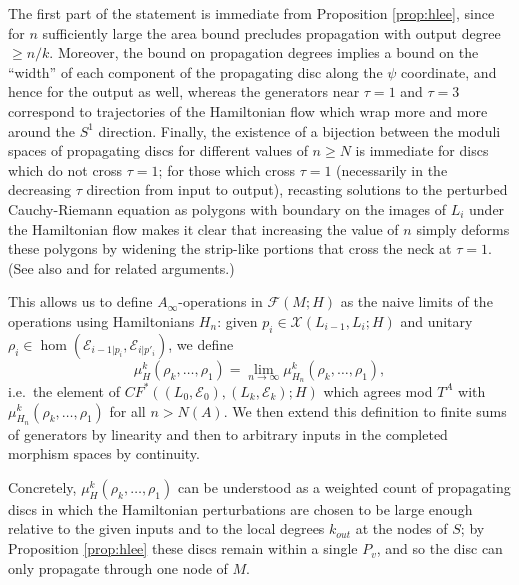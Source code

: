 \documentclass[11pt,leqno]{amsart}
\numberwithin{equation}{section}
\def\F{{\mathcal F}}
\newcommand{\cE}{{\mathcal E}}
\newcommand{\cX}{{\mathcal X}}
\begin{document}
\proof The first part of the statement is immediate from Proposition \ref{prop:hlee}, 
since for $n$ sufficiently large the area bound precludes propagation with output degree $\geq n/k$.
Moreover, the bound on propagation degrees implies a bound on the ``width'' of
each component of the propagating disc along the $\psi$ coordinate, and
hence for the output as well, whereas 
the generators near $\tau=1$ and $\tau=3$ correspond to trajectories of the
Hamiltonian flow which wrap more and more around the $S^1$ direction.
Finally, the existence of a bijection between the moduli spaces
of propagating discs for different values of $n\geq N$ is immediate for
discs which do not cross $\tau=1$; for those which cross $\tau=1$ (necessarily in the decreasing
$\tau$ direction from input to output), recasting
solutions to the perturbed Cauchy-Riemann equation as polygons with boundary on
the images of  $L_i$ under the Hamiltonian flow makes it clear that
increasing the value of $n$ simply deforms these polygons by widening
the strip-like portions that cross the neck at $\tau=1$.
(See also \cite[Section 3]{Lee} and \cite[Section 5]{AuSm} for related
arguments.)
\endproof

This allows us to define $A_\infty$-operations in $\F(M;H)$ as the naive
limits of the operations using Hamiltonians $H_n$: given $p_i\in
\cX(L_{i-1},L_i;H)$ and unitary $\rho_i\in \hom(\cE_{i-1|p_i},\cE_{i|p'_i})$, we
define
\begin{equation}\label{eq:mu_k_H}
\mu^k_H(\rho_k,\dots,\rho_1)=\lim_{n\to \infty} \mu^k_{H_n}(\rho_k,\dots,\rho_1),
\end{equation}
i.e.\ the element of $CF^*((L_0,\cE_0),(L_k,\cE_k);H)$ which agrees mod
$T^A$ with $\mu^k_{H_n}(\rho_k,\dots,\rho_1)$ for all $n> N(A)$.
We then extend this definition to finite sums of generators by linearity and then
to arbitrary inputs in the completed morphism spaces by continuity.

Concretely, $\mu^k_H(\rho_k,\dots,\rho_1)$ can be understood as a weighted
count of propagating discs in which the Hamiltonian perturbations are chosen
to be large enough relative to the given inputs and to the local degrees $k_{out}$
at the nodes of $S$; by Proposition \ref{prop:hlee} these discs remain
within a single $P_v$, and so the disc can only propagate through one node of $M.$
\end{document}
